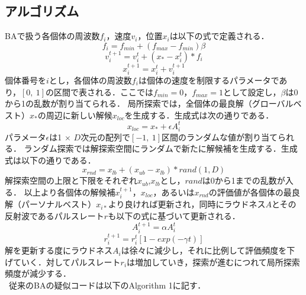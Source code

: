 \documentclass{jarticle}
\begin{document}
\subsection{アルゴリズム}
BAで扱う各個体の周波数$f_i$，速度$v_i$，位置$x_i$は以下の式で定義される．
\begin{equation}
f_{i} =f_{min}+(f_{max}-f_{min}) \beta
\label{eq:freq} 
\end{equation}
\begin{equation}
v_i^{t+1}=v_i^{t}+(x_*-x_i^t)* f_i
\label{eq:vi}
\end{equation}
\begin{equation}
x_i^{t+1}=x_i^{t}+v_i^{t+1}
\label{eq:xi}
\end{equation}
個体番号を$i$とし，各個体の周波数${f_i}$は個体の速度を制限するパラメータであり，$[0, \ 1]$の区間で表される．ここでは${f_{min}=0}$，${f_{max}=1}$として設定し，$\beta$は0から1の乱数が割り当てられる．
局所探索では，全個体の最良解（グローバルベスト）$x_*$の周辺に新しい解候${x_{loc}}$を生成する．生成式は次の通りである．
\begin{equation}
\label{eq:loc}
x_{loc}=x_* + \epsilon A_i^t
\end{equation}
パラメータ$\epsilon$は1 $\times$ $D$次元の配列で$[-1, \ 1]$区間のランダムな値が割り当てられる． ランダム探索では解探索空間にランダムで新たに解候補を生成する．生成式は以下の通りである．
\begin{equation}
\label{eq:rnd}
x_{rnd}=x_{lb} + (x_{ub} - x_{lb})*rand(1,D)
\end{equation}
解探索空間の上限と下限をそれぞれ$x_{ub}$,$x_{lb}$とし，$rand$は0から1までの乱数が入る．
以上より各個体の解候補${x_i^{t+1}}$，${x_{loc}}$，あるいは$x_{rnd}$の評価値が各個体の最良解（パーソナルベスト）$x_{i*}$より良ければ更新され，同時にラウドネス$A$とその反射波であるパルスレート$r$も以下の式に基づいて更新される．
\begin{equation}
\label{eq:loud}
A_i^{t+1}= \alpha A_i^t
\end{equation}
\begin{equation}
\label{eq:pulse}
r_i^{t+1}=r_i^t[1-exp(- \gamma t)]
\end{equation}
解を更新する度にラウドネス$A_i$は徐々に減少し，それに比例して評価頻度を下げていく．対してパルスレート$r_i$は増加していき，探索が進むにつれて局所探索頻度が減少する．\\ \
従来のBAの疑似コードは以下のAlgorithm 1に記す．
\end{document}
